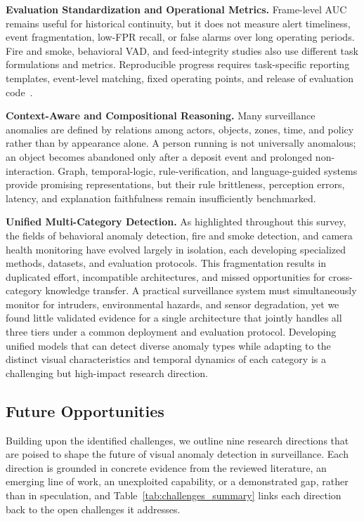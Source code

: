 \documentclass[10pt,a4paper]{article}
\begin{document}
\noindent\textbf{Evaluation Standardization and Operational Metrics.}
Frame-level AUC remains useful for historical continuity, but it does not measure alert timeliness, event fragmentation, low-FPR recall, or false alarms over long operating periods. Fire and smoke, behavioral VAD, and feed-integrity studies also use different task formulations and metrics. Reproducible progress requires task-specific reporting templates, event-level matching, fixed operating points, and release of evaluation code~\citep{acharya2026road,rashvand2026frames}.

\noindent\textbf{Context-Aware and Compositional Reasoning.}
Many surveillance anomalies are defined by relations among actors, objects, zones, time, and policy rather than by appearance alone. A person running is not universally anomalous; an object becomes abandoned only after a deposit event and prolonged non-interaction. Graph, temporal-logic, rule-verification, and language-guided systems provide promising representations, but their rule brittleness, perception errors, latency, and explanation faithfulness remain insufficiently benchmarked.

\noindent\textbf{Unified Multi-Category Detection.} As highlighted throughout this survey, the fields of behavioral anomaly detection, fire and smoke detection, and camera health monitoring have evolved largely in isolation, each developing specialized methods, datasets, and evaluation protocols. This fragmentation results in duplicated effort, incompatible architectures, and missed opportunities for cross-category knowledge transfer. A practical surveillance system must simultaneously monitor for intruders, environmental hazards, and sensor degradation, yet we found little validated evidence for a single architecture that jointly handles all three tiers under a common deployment and evaluation protocol. Developing unified models that can detect diverse anomaly types while adapting to the distinct visual characteristics and temporal dynamics of each category is a challenging but high-impact research direction.


\subsection{Future Opportunities}
\label{subsec:future_opportunities}

Building upon the identified challenges, we outline nine research directions that are poised to shape the future of visual anomaly detection in surveillance. Each direction is grounded in concrete evidence from the reviewed literature, an emerging line of work, an unexploited capability, or a demonstrated gap, rather than in speculation, and Table~\ref{tab:challenges_summary} links each direction back to the open challenges it addresses.
\end{document}
